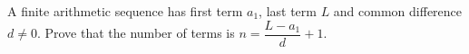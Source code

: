 A finite arithmetic sequence has first term $a_1$, last term $L$ and common difference $d\ne0$. Prove that the number of terms is $n=\dfrac{L-a_1}{d}+1$.
